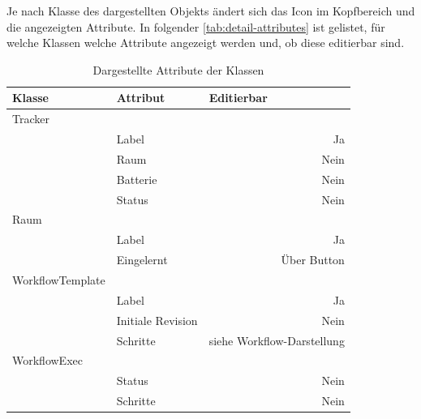 Je nach Klasse des dargestellten Objekts ändert sich das Icon im Kopfbereich und die angezeigten Attribute.
In folgender \autoref{tab:detail-attributes} ist gelistet, für welche Klassen welche Attribute angezeigt werden und, ob diese editierbar sind.

\begin{table}[]
\centering
\begin{tabular}{l|l|r}
\textbf{Klasse}  & \textbf{Attribut} & \multicolumn{1}{l}{\textbf{Editierbar}} \\ \hline
Tracker          &                   &                                         \\
                 & Label             & Ja                                      \\
                 & Raum              & Nein                                    \\
                 & Batterie          & Nein                                    \\
                 & Status            & Nein                                    \\ \hline
Raum             &                   & \multicolumn{1}{l}{}                    \\
                 & Label             & Ja                                      \\
                 & Eingelernt        & Über Button                             \\ \hline
WorkflowTemplate &                   & \multicolumn{1}{l}{}                    \\
                 & Label             & Ja                                      \\
                 & Initiale Revision & Nein                                    \\
                 & Schritte          & siehe Workflow-Darstellung              \\ \hline
WorkflowExec     &                   & \multicolumn{1}{l}{}                    \\
                 & Status            & Nein                                    \\
                 & Schritte          & Nein
\end{tabular}
\caption{Dargestellte Attribute der Klassen}
\label{tab:detail-attributes}
\end{table}


